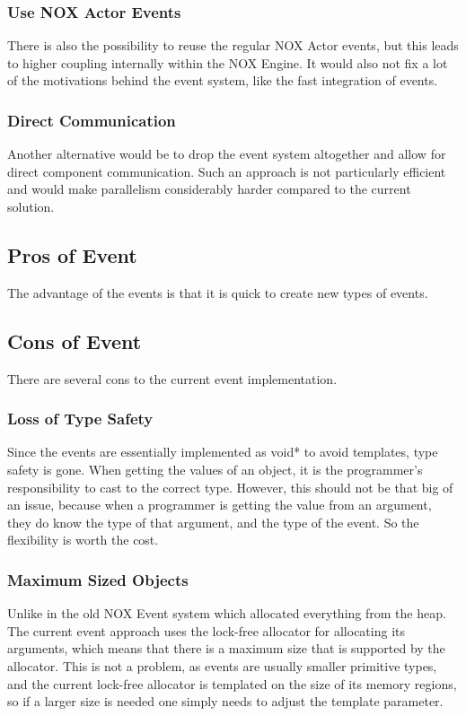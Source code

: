 \subsubsection{Use NOX Actor Events}
There is also the possibility to reuse the regular NOX Actor events,
but this leads to higher coupling internally within the NOX Engine.
It would also not fix a lot of the motivations behind the event system, like the fast integration of events.

\subsubsection{Direct Communication}
Another alternative would be to drop the event system altogether and allow for direct component communication.
Such an approach is not particularly efficient and would make parallelism considerably harder compared to the current solution.

\subsection{Pros of Event}
The advantage of the events is that it is quick to create new types of events.

\subsection{Cons of Event}
There are several cons to the current event implementation.

\subsubsection{Loss of Type Safety}
Since the events are essentially implemented as void* to avoid templates, type safety is gone.
When getting the values of an object, it is the programmer's responsibility to cast to the correct type.
However, this should not be that big of an issue, because when a programmer is getting the value from an argument, they do know the type of that argument, and the type of the event.
So the flexibility is worth the cost.

\subsubsection{Maximum Sized Objects}
Unlike in the old NOX Event system which allocated everything from the heap.
The current event approach uses the lock-free allocator for allocating its arguments, which means that there is a maximum size that is supported by the allocator.
This is not a problem, as events are usually smaller primitive types, and the current lock-free allocator is templated on the size of its memory regions, so if a larger size is needed one simply needs to adjust the template parameter.

